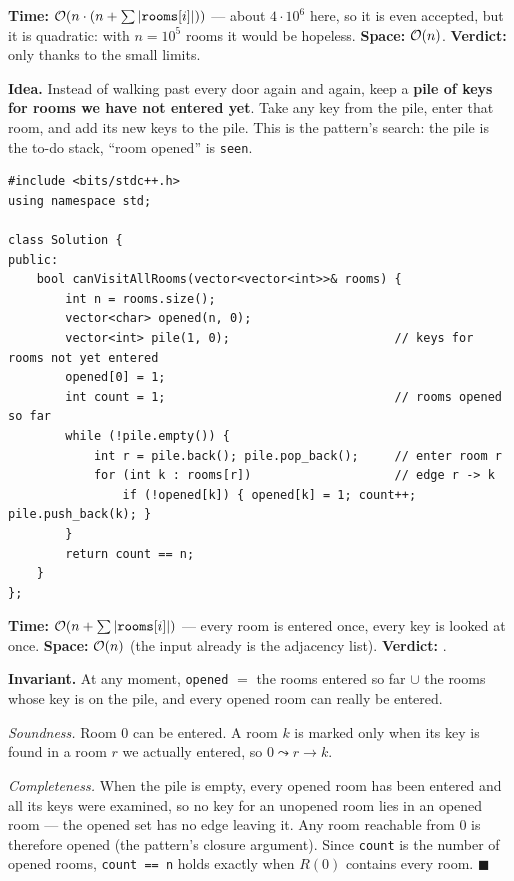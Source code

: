 \begin{bruteforcebox}
\begin{complexitybox}
\textbf{Time:} $\mathcal{O}(n \cdot (n + \sum|\texttt{rooms}[i]|))$ --- about $4 \cdot 10^6$ here, so it is even accepted, but it is quadratic: with $n = 10^5$ rooms it would be hopeless. \textbf{Space:} $\mathcal{O}(n)$. \textbf{Verdict:} \ac{} only thanks to the small limits.
\end{complexitybox}
\end{bruteforcebox}

\begin{algorithmbox}
\textbf{Idea.} Instead of walking past every door again and again, keep a \textbf{pile of keys for rooms we have not entered yet}. Take any key from the pile, enter that room, and add its new keys to the pile. This is the pattern's search: the pile is the to-do stack, ``room opened'' is \texttt{seen}.

\begin{lstlisting}[style=cpp]
#include <bits/stdc++.h>
using namespace std;

class Solution {
public:
    bool canVisitAllRooms(vector<vector<int>>& rooms) {
        int n = rooms.size();
        vector<char> opened(n, 0);
        vector<int> pile(1, 0);                       // keys for rooms not yet entered
        opened[0] = 1;
        int count = 1;                                // rooms opened so far
        while (!pile.empty()) {
            int r = pile.back(); pile.pop_back();     // enter room r
            for (int k : rooms[r])                    // edge r -> k
                if (!opened[k]) { opened[k] = 1; count++; pile.push_back(k); }
        }
        return count == n;
    }
};
\end{lstlisting}

\begin{complexitybox}
\textbf{Time:} $\mathcal{O}(n + \sum|\texttt{rooms}[i]|)$ --- every room is entered once, every key is looked at once. \textbf{Space:} $\mathcal{O}(n)$ (the input already is the adjacency list). \textbf{Verdict:} \ac{}.
\end{complexitybox}
\end{algorithmbox}

\begin{invariantbox}
\textbf{Invariant.} At any moment, \texttt{opened} $=$ the rooms entered so far $\cup$ the rooms whose key is on the pile, and every opened room can really be entered.

\emph{Soundness.} Room 0 can be entered. A room $k$ is marked only when its key is found in a room $r$ we actually entered, so $0 \leadsto r \to k$.

\emph{Completeness.} When the pile is empty, every opened room has been entered and all its keys were examined, so no key for an unopened room lies in an opened room --- the opened set has no edge leaving it. Any room reachable from 0 is therefore opened (the pattern's closure argument). Since \texttt{count} is the number of opened rooms, \texttt{count == n} holds exactly when $R(0)$ contains every room. \hfill$\blacksquare$
\end{invariantbox}

